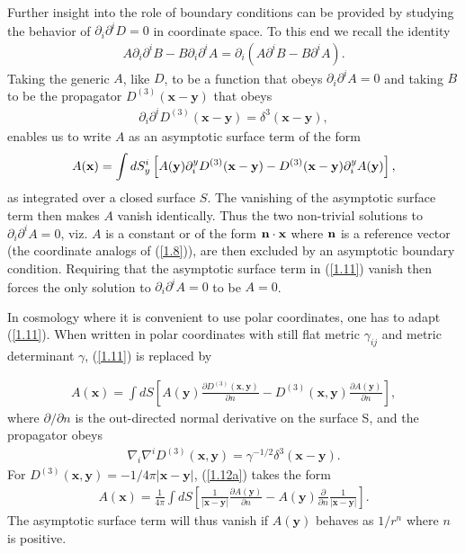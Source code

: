 \documentclass[aps,onecolumn,10pt]{revtex4}
\numberwithin{equation}{section}
\numberwithin{equation}{section}
\begin{document}
Further insight into the role of boundary conditions can be provided by studying the behavior of $\partial_i\partial^iD=0$ in coordinate space. To this end  we recall the identity
%
\begin{eqnarray}
A \partial_i\partial^iB-B \partial_i\partial^iA=\partial_i(A\partial^iB-B\partial^iA).
\label{1.9}
\end{eqnarray}
%
Taking the generic $A$, like $D$, to be a function that obeys $\partial_i\partial^iA=0$ and taking $B$ to be the propagator $D^{(3)}(\mathbf{x}-\mathbf{y})$ that obeys 
%
\begin{eqnarray}
\partial_i\partial^iD^{(3)}(\mathbf{x}-\mathbf{y})=\delta^3(\mathbf{x}-\mathbf{y}),
\label{1.10}
\end{eqnarray}
%
enables us to write $A$ as an asymptotic surface term of the form 
%
\begin{eqnarray}
A({\bf x}) =\int dS_y^i\left[A({\bf y})\partial^y_iD^{(3)}(\mathbf{x}-\mathbf{y})-D^{(3)}(\mathbf{x}-\mathbf{y})\partial^y_iA({\bf y})\right],
\label{1.11}
\end{eqnarray}
%
as integrated over a closed surface $S$. The vanishing of the asymptotic surface term then makes $A$ vanish identically. Thus the two non-trivial solutions to $\partial_i\partial^iA=0$, viz. $A$  is a constant or of the form ${\bf n}\cdot {\bf x}$ where ${\bf n}$ is a reference vector (the coordinate analogs of  (\ref{1.8})), are then excluded by an asymptotic boundary condition. Requiring that the asymptotic surface term in (\ref{1.11}) vanish then forces the only solution to $\partial_i\partial^iA=0$ to be $A=0$.

In cosmology where it is convenient to use  polar coordinates, one has to adapt (\ref{1.11}). When written  in polar coordinates with still flat metric $\gamma_{ij}$ and metric determinant $\gamma$, (\ref{1.11}) is replaced by 

%
\begin{eqnarray}
A(\textbf{x})=\int dS\left[A(\mathbf{y})\frac{\partial D^{(3)}(\mathbf{x},\mathbf{y})}{\partial  n} -D^{(3)}(\mathbf{x},\mathbf{y})\frac{\partial A(\mathbf{y})}{\partial n}\right],
\label{1.12a}
\end{eqnarray}
%
where $\partial/\partial n$ is the out-directed normal derivative on the surface S, and the propagator obeys
%
\begin{eqnarray}
\nabla_i\nabla^iD^{(3)}(\mathbf{x},\mathbf{y})=\gamma^{-1/2}\delta^3(\mathbf{x}-\mathbf{y}).
\label{1.13a}
\end{eqnarray}
%
For $D^{(3)}(\mathbf{x},\mathbf{y})=-1/4\pi|\mathbf{x}-\mathbf{y}|$, (\ref{1.12a}) takes the form
%
\begin{eqnarray}
A(\textbf{x})=\frac{1}{4\pi} \int dS\left[\frac{1}{|\mathbf{x}-\mathbf{y}|}\frac{\partial A(\mathbf{y})}{\partial n}-
A(\mathbf{y})\frac{\partial}{\partial  n}\frac{1}{|\mathbf{x}-\mathbf{y}|}\right].
\label{1.14a}
\end{eqnarray}
%
The asymptotic surface term will thus vanish if $A(\mathbf{y})$ behaves as $1/r^{n}$ where $n$ is positive.
\end{document}
